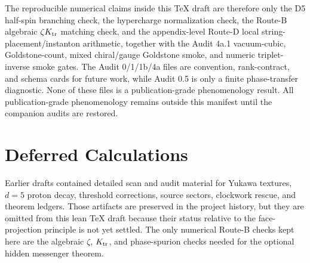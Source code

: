 \documentclass[
  aps,
  prd,
  preprint,
  nofootinbib,
  superscriptaddress,
  longbibliography
]{revtex4-2}
\begin{document}
The reproducible numerical claims inside this TeX draft are therefore only the
D5 half-spin branching check, the hypercharge normalization check, the
Route-B algebraic \(\zeta K_{\rm tr}\) matching check, and the appendix-level
Route-D local string-placement/instanton arithmetic, together with the
Audit 4a.1 vacuum-cubic, Goldstone-count, mixed chiral/gauge Goldstone smoke,
and numeric triplet-inverse smoke gates.  The Audit 0/1/1b/4a files are convention,
rank-contract, and schema cards for future work, while Audit 0.5 is only a
finite phase-transfer diagnostic.  None of these files is a publication-grade
phenomenology result.  All publication-grade phenomenology remains outside
this manifest until the companion audits are restored.

\section{Deferred Calculations}

Earlier drafts contained detailed scan and audit material for Yukawa textures,
\(d=5\) proton decay, threshold corrections, source sectors, clockwork rescue,
and theorem ledgers.  Those artifacts are preserved in the project history,
but they are omitted from this lean TeX draft because their status relative to
the face-projection principle is not yet settled.  The only numerical Route-B
checks kept here are the algebraic \(\zeta\), \(K_{\rm tr}\), and
phase-spurion checks needed for the optional hidden messenger theorem.
\end{document}
